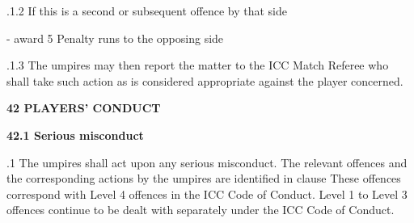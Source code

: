 \documentclass[12pt]{article}
\begin{document}
\vspace{\baselineskip}
\begin{adjustwidth}{0.49in}{0.0in}
{\fontsize{9pt}{10.8pt}.1.2 \tabto{1.17in} If this is a second or subsequent offence by that side\par}\par

\end{adjustwidth}


\vspace{\baselineskip}
\begin{adjustwidth}{1.12in}{0.0in}
{\fontsize{9pt}{10.8pt}\selectfont - award 5 Penalty runs to the opposing side\par}\par

\end{adjustwidth}


\vspace{\baselineskip}
\begin{adjustwidth}{1.18in}{0.01in}
{\fontsize{9pt}{10.8pt}.1.3 \tabto{1.17in} The umpires may then report the matter to the ICC Match Referee who shall take such action as is considered appropriate against the player concerned.\par}\par

\end{adjustwidth}


\vspace{\baselineskip}

\vspace{\baselineskip}
{\fontsize{16pt}{19.2pt}\selectfont \textbf{42 PLAYERS’ CONDUCT}\par}\par


\vspace{\baselineskip}
{\fontsize{11pt}{13.2pt}\selectfont \textbf{42.1 \tabto{0.47in} Serious misconduct}\par}\par


\vspace{\baselineskip}
\begin{adjustwidth}{0.5in}{0.01in}
{\fontsize{9pt}{10.8pt}.1 \tabto{0.49in} The umpires shall act upon any serious misconduct. The relevant offences and the corresponding actions by the umpires are identified in clause These offences correspond with Level 4 offences in the ICC Code of Conduct. Level 1 to Level 3 offences continue to be dealt with separately under the ICC Code of Conduct.\par}\par

\end{adjustwidth}
\end{document}

